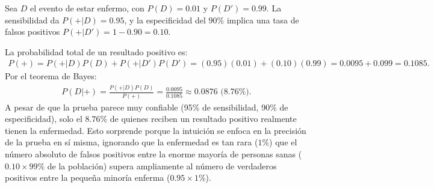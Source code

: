 \begin{solproblema}
	Sea $D$ el evento de estar enfermo, con $P(D)=0.01$ y $P(D')=0.99$. La sensibilidad da $P(+|D)=0.95$, y la especificidad del $90\%$ implica una tasa de falsos positivos $P(+|D')=1-0.90=0.10$.

	La probabilidad total de un resultado positivo es:
	\begin{align}
		P(+) = P(+|D)P(D) + P(+|D')P(D') = (0.95)(0.01) + (0.10)(0.99) = 0.0095 + 0.099 = 0.1085.
	\end{align}
	Por el teorema de Bayes:
	\begin{align}
		P(D|+) = \frac{P(+|D)P(D)}{P(+)} = \frac{0.0095}{0.1085} \approx 0.0876 \text{ (8.76\%).}
	\end{align}
	A pesar de que la prueba parece muy confiable (95\% de sensibilidad, 90\% de especificidad), solo el $8.76\%$ de quienes reciben un resultado positivo realmente tienen la enfermedad. Esto sorprende porque la intuición se enfoca en la precisión de la prueba en sí misma, ignorando que la enfermedad es tan rara ($1\%$) que el número absoluto de falsos positivos entre la enorme mayoría de personas sanas ($0.10 \times 99\%$ de la población) supera ampliamente al número de verdaderos positivos entre la pequeña minoría enferma ($0.95\times1\%$).
\end{solproblema}
